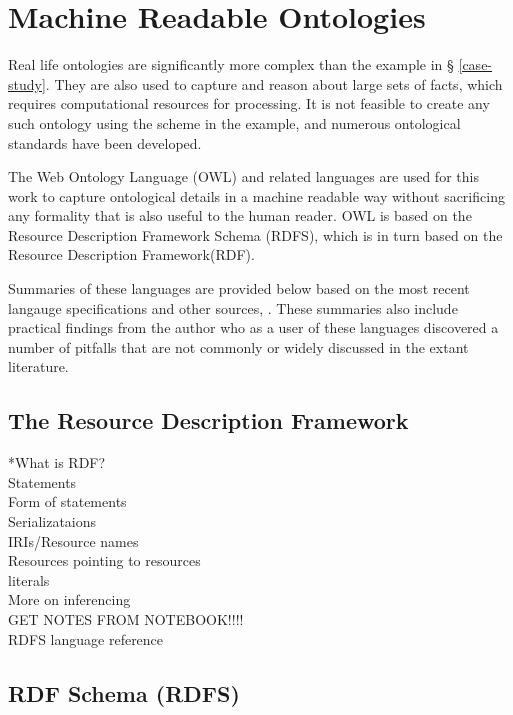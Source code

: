 \section{Machine Readable Ontologies}

Real life ontologies are significantly more complex than the example in \S
\ref{case-study}. They are also used to capture and reason about large sets of
facts, which requires computational resources for processing. It is not feasible
to create any such ontology using the scheme in the example, and numerous
ontological standards have been developed. 

The Web Ontology Language (OWL) and related languages are used for this work to
capture ontological details in a machine readable way without sacrificing any
formality that is also useful to the human reader. OWL is based on the Resource
Description Framework Schema (RDFS), which is in turn based on the Resource
Description Framework(RDF).

Summaries of these languages are provided below based on the most recent
langauge specifications and other sources, \cite{allemang}. These summaries also
include practical findings from the author who as a user of these languages
discovered a number of pitfalls that are not commonly or widely discussed in the
extant literature.

\subsection{The Resource Description Framework}

*What is RDF?\\
Statements\\
Form of statements\\
Serializataions\\
IRIs/Resource names\\
Resources pointing to resources\\
literals\\
More on inferencing\\
GET NOTES FROM NOTEBOOK!!!!\\
RDFS language reference\\


\subsection{RDF Schema (RDFS)}

